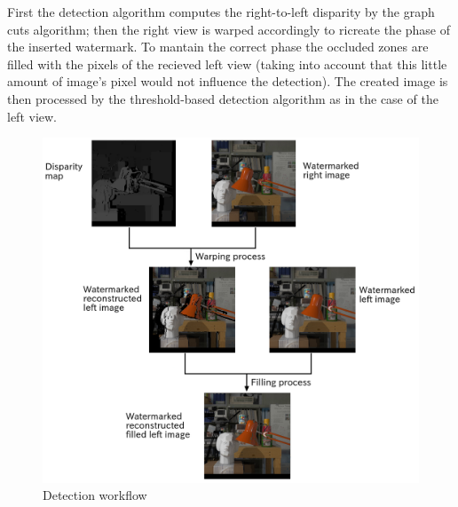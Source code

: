 First the detection algorithm computes the right-to-left disparity by the graph cuts algorithm; then the right view is warped accordingly to ricreate the phase of the inserted watermark. To mantain the correct phase the occluded zones are filled with the pixels of the recieved left view (taking into account that this little amount of image's pixel would not influence the detection).\newline
The created image is then processed by the threshold-based detection algorithm as in the case of the left view.\newline 

\begin{figure}[h!]
\centering
\includegraphics[width=1\textwidth]{./img/detection_workflow.png}
\caption{\small{Detection workflow}}
\label{fig:detflow}
\end{figure}

